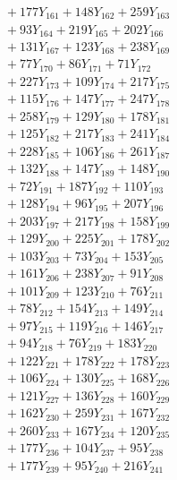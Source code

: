 \documentclass[a4paper,10pt]{article}
\begin{document}
{\begin{align}
&\;  + 177 Y_{161} + 148 Y_{162} + 259 Y_{163} \\[0.3ex]
&\;  + 93 Y_{164} + 219 Y_{165} + 202 Y_{166} \\[0.3ex]
&\;  + 131 Y_{167} + 123 Y_{168} + 238 Y_{169} \\[0.3ex]
&\;  + 77 Y_{170} + 86 Y_{171} + 71 Y_{172} \\[0.3ex]
&\;  + 227 Y_{173} + 109 Y_{174} + 217 Y_{175} \\[0.3ex]
&\;  + 115 Y_{176} + 147 Y_{177} + 247 Y_{178} \\[0.5ex]\allowbreak
&\;  + 258 Y_{179} + 129 Y_{180} + 178 Y_{181} \\[0.3ex]
&\;  + 125 Y_{182} + 217 Y_{183} + 241 Y_{184} \\[0.3ex]
&\;  + 228 Y_{185} + 106 Y_{186} + 261 Y_{187} \\[0.3ex]
&\;  + 132 Y_{188} + 147 Y_{189} + 148 Y_{190} \\[0.3ex]
&\;  + 72 Y_{191} + 187 Y_{192} + 110 Y_{193} \\[0.3ex]
&\;  + 128 Y_{194} + 96 Y_{195} + 207 Y_{196} \\[0.3ex]
&\;  + 203 Y_{197} + 217 Y_{198} + 158 Y_{199} \\[0.3ex]
&\;  + 129 Y_{200} + 225 Y_{201} + 178 Y_{202} \\[0.3ex]
&\;  + 103 Y_{203} + 73 Y_{204} + 153 Y_{205} \\[0.3ex]
&\;  + 161 Y_{206} + 238 Y_{207} + 91 Y_{208} \\[0.5ex]\allowbreak
&\;  + 101 Y_{209} + 123 Y_{210} + 76 Y_{211} \\[0.3ex]
&\;  + 78 Y_{212} + 154 Y_{213} + 149 Y_{214} \\[0.3ex]
&\;  + 97 Y_{215} + 119 Y_{216} + 146 Y_{217} \\[0.3ex]
&\;  + 94 Y_{218} + 76 Y_{219} + 183 Y_{220} \\[0.3ex]
&\;  + 122 Y_{221} + 178 Y_{222} + 178 Y_{223} \\[0.3ex]
&\;  + 106 Y_{224} + 130 Y_{225} + 168 Y_{226} \\[0.3ex]
&\;  + 121 Y_{227} + 136 Y_{228} + 160 Y_{229} \\[0.3ex]
&\;  + 162 Y_{230} + 259 Y_{231} + 167 Y_{232} \\[0.3ex]
&\;  + 260 Y_{233} + 167 Y_{234} + 120 Y_{235} \\[0.3ex]
&\;  + 177 Y_{236} + 104 Y_{237} + 95 Y_{238} \\[0.5ex]\allowbreak
&\;  + 177 Y_{239} + 95 Y_{240} + 216 Y_{241} \\[0.3ex]

\end{align}}
\end{document}
